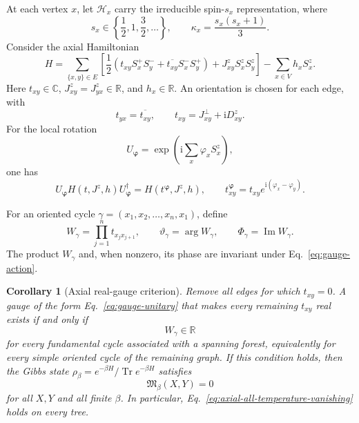 \documentclass[11pt]{article}
\newcommand{\Tr}{\operatorname{Tr}}
\newcommand{\Mmod}{\mathfrak{M}}
\newcommand{\ii}{\mathrm{i}}
\newtheorem{corollary}[theorem]{Corollary}
\begin{document}
At each vertex $x$, let $\mathcal H_x$ carry the irreducible spin-$s_x$
representation, where
\begin{equation}
 s_x\in\left\{\frac12,1,\frac32,\ldots\right\},
 \qquad
 \kappa_x=\frac{s_x(s_x+1)}3.
 \label{eq:kappa-definition}
\end{equation}
Consider the axial Hamiltonian
\begin{equation}
 H=\sum_{\{x,y\}\in E}
 \left[
 \frac12\left(
 t_{xy}S_x^+S_y^-+\overline{t_{xy}}S_x^-S_y^+
 \right)
 +J_{xy}^zS_x^zS_y^z
 \right]
 -\sum_{x\in V}h_xS_x^z.
 \label{eq:axial-H}
\end{equation}
Here $t_{xy}\in\mathbb C$, $J_{xy}^z=J_{yx}^z\in\mathbb R$, and
$h_x\in\mathbb R$.  An orientation is chosen for each edge, with
\begin{equation}
 t_{yx}=\overline{t_{xy}},
 \qquad
 t_{xy}=J_{xy}^{\perp}+\ii D_{xy}^z.
 \label{eq:t-definition}
\end{equation}
For the local rotation
\begin{equation}
 U_{\bm\varphi}
 =\exp\left(\ii\sum_x\varphi_xS_x^z\right),
 \label{eq:gauge-unitary}
\end{equation}
one has
\begin{equation}
 U_{\bm\varphi}H(t,J^z,h)U_{\bm\varphi}^\dagger
 =H(t^{\bm\varphi},J^z,h),
 \qquad
 t_{xy}^{\bm\varphi}
 =t_{xy}e^{\ii(\varphi_x-\varphi_y)}.
 \label{eq:gauge-action}
\end{equation}

For an oriented cycle
\(
\gamma=(x_1,x_2,\ldots,x_n,x_1)
\), define
\begin{equation}
 W_\gamma
 =\prod_{j=1}^nt_{x_jx_{j+1}},
 \qquad
 \vartheta_\gamma=\arg W_\gamma,
 \qquad
 \Phi_\gamma=\operatorname{Im}W_\gamma.
 \label{eq:Wilson-definitions}
\end{equation}
The product $W_\gamma$ and, when nonzero, its phase are invariant under
Eq.~\eqref{eq:gauge-action}.

\begin{corollary}[Axial real-gauge criterion]
\label{cor:real-gauge}
Remove all edges for which $t_{xy}=0$.  A gauge of the form
Eq.~\eqref{eq:gauge-unitary} that makes every remaining $t_{xy}$ real exists
if and only if
\begin{equation}
 W_\gamma\in\mathbb R
 \label{eq:real-Wilson-products}
\end{equation}
for every fundamental cycle associated with a spanning forest, equivalently
for every simple oriented cycle of the remaining graph.  If this condition holds,
then the Gibbs state $\rho_\beta=e^{-\beta H}/\Tr e^{-\beta H}$ satisfies
\begin{equation}
 \Mmod_\beta(X,Y)=0
 \label{eq:axial-all-temperature-vanishing}
\end{equation}
for all $X,Y$ and all finite $\beta$.  In particular,
Eq.~\eqref{eq:axial-all-temperature-vanishing} holds on every tree.
\end{corollary}
\end{document}
